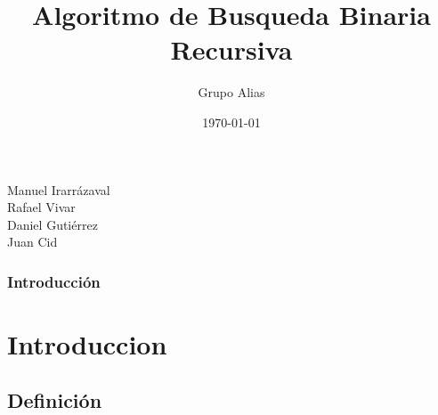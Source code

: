 \documentclass{beamer}
\title[Busqueda Binaria Recursiva]{Algoritmo de Busqueda Binaria Recursiva} %
\author{Grupo Alias} %
\institute[UTEM] %
{
Universidad Tecnológica Metropolitana\\  %
\medskip
\url{https://github.com/Lanceconan/AnalisisDeAlgoritmos} %
}
\date{\today} %
\begin{document}

\begin{frame}
	\titlepage %
\begin{center}
Manuel Irarrázaval \\  Rafael Vivar \\ Daniel Gutiérrez \\ Juan Cid
\end{center}
\end{frame}

\begin{frame}
	\frametitle{Introducción} %
	\tableofcontents %
\end{frame}


\section{Introduccion} %

	\subsection{Definición} %
\end{document}
